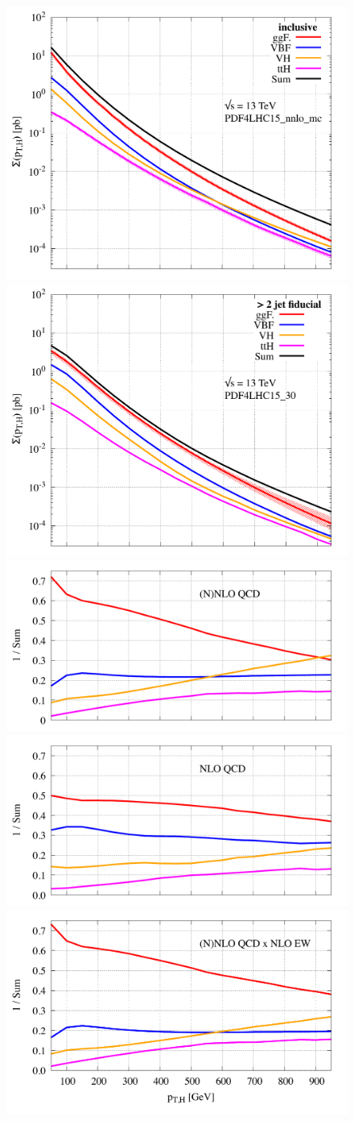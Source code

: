 \documentclass[10pt,prd,fleqn,superscriptaddress,notitlepage,nofootinbib,preprintnumbers,nobalancelastpage]{revtex4-1}
\begin{document}
\begin{figure}[t!]
\centering
\includegraphics[width=.45\textwidth]{figures/pTH_incl.pdf}
\includegraphics[width=.45\textwidth]{figures/pTH_fid.pdf}
\\\vspace{-1.1em}
\includegraphics[width=.45\textwidth]{figures/pTH_incl-ratio-QCD.pdf}
\includegraphics[width=.45\textwidth]{figures/pTH_fid-ratio-QCD.pdf}
\\\vspace{-1.1em}
\includegraphics[width=.45\textwidth]{figures/pTH_incl-ratio-QCDEW.pdf}

\end{figure}
\end{document}

